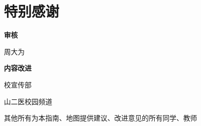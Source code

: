 \chapter*{特别感谢}
\noindent\begin{table*}[h]
    \centering
    \vspace{3em}
    {
        \large
        \noindent \textbf{审核}
    }

    \vspace{.8em}
    周大为

    \vspace{3em}

    {
    \large
    \noindent \textbf{内容改进}
    }

    \vspace{.8em}

    校宣传部

    山二医校园频道

    \vspace{10em}
    {
    \Large
    其他所有为本指南、地图提供建议、改进意见的所有同学、教师
    }

\end{table*}